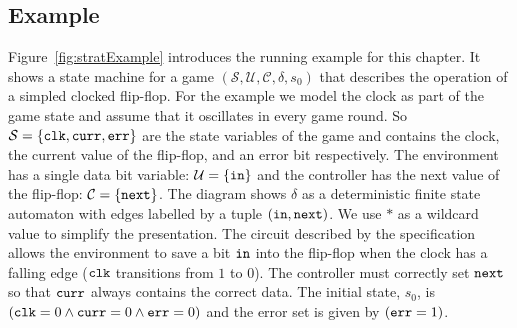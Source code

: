 \subsection{Example}

Figure~\ref{fig:stratExample} introduces the running example for this chapter. It shows a state machine for a game $(\mathcal{S}, \mathcal{U}, \mathcal{C}, \delta, s_0)$ that describes the operation of a simpled clocked flip-flop. For the example we model the clock as part of the game state and assume that it oscillates in every game round. So $\mathcal{S} = \{ \texttt{clk}, \texttt{curr}, \texttt{err} \}$ are the state variables of the game and contains the clock, the current value of the flip-flop, and an error bit respectively. The environment has a single data bit variable: $\mathcal{U} = \{ \texttt{in} \}$ and the controller has the next value of the flip-flop: $\mathcal{C} = \{ \texttt{next} \}$. The diagram shows $\delta$ as a deterministic finite state automaton with edges labelled by a tuple $(\texttt{in}, \texttt{next})$. We use $*$ as a wildcard value to simplify the presentation. The circuit described by the specification allows the environment to save a bit $\texttt{in}$ into the flip-flop when the clock has a falling edge ($\texttt{clk}$ transitions from $1$ to $0$). The controller must correctly set $\texttt{next}$ so that $\texttt{curr}$ always contains the correct data. The initial state, $s_0$, is $(\texttt{clk} = 0 \land \texttt{curr} = 0 \land \texttt{err} = 0)$ and the error set is given by $(\texttt{err} = 1)$.


